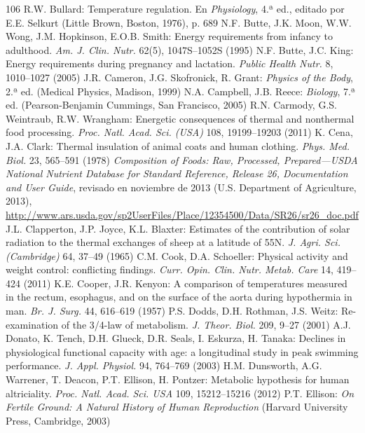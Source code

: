 \documentclass[12pt]{book}
\begin{document}
\begin{thebibliography}{106}
   R.W. Bullard: Temperature regulation. En \textit{Physiology}, 4.ª ed., editado por E.E. Selkurt (Little Brown, Boston, 1976), p. 689
   N.F. Butte, J.K. Moon, W.W. Wong, J.M. Hopkinson, E.O.B. Smith: Energy requirements from infancy to adulthood. \textit{Am. J. Clin. Nutr.} 62(5), 1047S--1052S (1995)
   N.F. Butte, J.C. King: Energy requirements during pregnancy and lactation. \textit{Public Health Nutr.} 8, 1010--1027 (2005)
   J.R. Cameron, J.G. Skofronick, R. Grant: \textit{Physics of the Body}, 2.ª ed. (Medical Physics, Madison, 1999)
   N.A. Campbell, J.B. Reece: \textit{Biology}, 7.ª ed. (Pearson-Benjamin Cummings, San Francisco, 2005)
   R.N. Carmody, G.S. Weintraub, R.W. Wrangham: Energetic consequences of thermal and nonthermal food processing. \textit{Proc. Natl. Acad. Sci. (USA)} 108, 19199--19203 (2011)
   K. Cena, J.A. Clark: Thermal insulation of animal coats and human clothing. \textit{Phys. Med. Biol.} 23, 565--591 (1978)
   \textit{Composition of Foods: Raw, Processed, Prepared---USDA National Nutrient Database for Standard Reference, Release 26, Documentation and User Guide}, revisado en noviembre de 2013 (U.S. Department of Agriculture, 2013), \url{http://www.ars.usda.gov/sp2UserFiles/Place/12354500/Data/SR26/sr26_doc.pdf}
   J.L. Clapperton, J.P. Joyce, K.L. Blaxter: Estimates of the contribution of solar radiation to the thermal exchanges of sheep at a latitude of 55N. \textit{J. Agri. Sci. (Cambridge)} 64, 37--49 (1965)
   C.M. Cook, D.A. Schoeller: Physical activity and weight control: conflicting findings. \textit{Curr. Opin. Clin. Nutr. Metab. Care} 14, 419--424 (2011)
   K.E. Cooper, J.R. Kenyon: A comparison of temperatures measured in the rectum, esophagus, and on the surface of the aorta during hypothermia in man. \textit{Br. J. Surg.} 44, 616--619 (1957)
   P.S. Dodds, D.H. Rothman, J.S. Weitz: Re-examination of the 3/4-law of metabolism. \textit{J. Theor. Biol.} 209, 9--27 (2001)
   A.J. Donato, K. Tench, D.H. Glueck, D.R. Seals, I. Eskurza, H. Tanaka: Declines in physiological functional capacity with age: a longitudinal study in peak swimming performance. \textit{J. Appl. Physiol.} 94, 764--769 (2003)
   H.M. Dunsworth, A.G. Warrener, T. Deacon, P.T. Ellison, H. Pontzer: Metabolic hypothesis for human altriciality. \textit{Proc. Natl. Acad. Sci. USA} 109, 15212--15216 (2012)
   P.T. Ellison: \textit{On Fertile Ground: A Natural History of Human Reproduction} (Harvard University Press, Cambridge, 2003)

\end{thebibliography}
\end{document}
